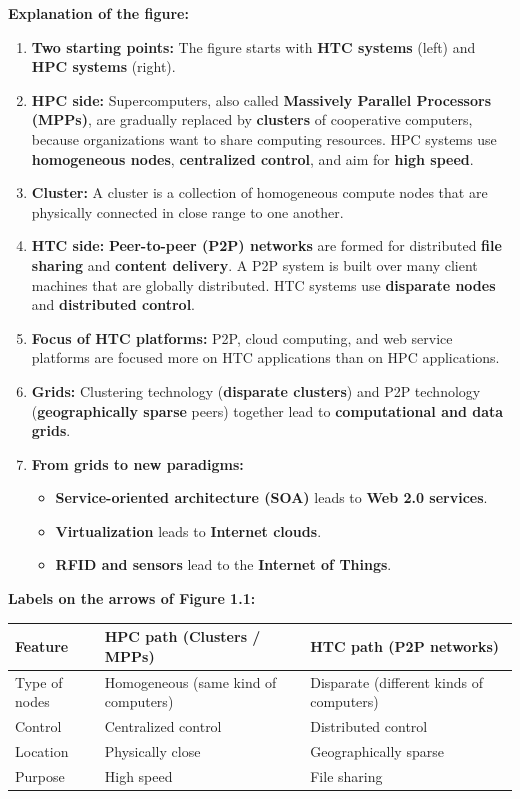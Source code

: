 \documentclass[11pt,a4paper]{article}
\begin{document}
\textbf{Explanation of the figure:}
\begin{enumerate}
\item \textbf{Two starting points:} The figure starts with \textbf{HTC systems} (left) and \textbf{HPC systems} (right).
\item \textbf{HPC side:} Supercomputers, also called \textbf{Massively Parallel Processors (MPPs)}, are gradually replaced by \textbf{clusters} of cooperative computers, because organizations want to share computing resources. HPC systems use \textbf{homogeneous nodes}, \textbf{centralized control}, and aim for \textbf{high speed}.
\item \textbf{Cluster:} A cluster is a collection of homogeneous compute nodes that are physically connected in close range to one another.
\item \textbf{HTC side:} \textbf{Peer-to-peer (P2P) networks} are formed for distributed \textbf{file sharing} and \textbf{content delivery}. A P2P system is built over many client machines that are globally distributed. HTC systems use \textbf{disparate nodes} and \textbf{distributed control}.
\item \textbf{Focus of HTC platforms:} P2P, cloud computing, and web service platforms are focused more on HTC applications than on HPC applications.
\item \textbf{Grids:} Clustering technology (\textbf{disparate clusters}) and P2P technology (\textbf{geographically sparse} peers) together lead to \textbf{computational and data grids}.
\item \textbf{From grids to new paradigms:}
  \begin{itemize}
  \item \textbf{Service-oriented architecture (SOA)} leads to \textbf{Web 2.0 services}.
  \item \textbf{Virtualization} leads to \textbf{Internet clouds}.
  \item \textbf{RFID and sensors} lead to the \textbf{Internet of Things}.
  \end{itemize}
\end{enumerate}

\textbf{Labels on the arrows of Figure 1.1:}

\begin{center}
\renewcommand{\arraystretch}{1.3}
\small
\begin{tabular}{|p{3cm}|p{5.4cm}|p{5.4cm}|}
\hline
\textbf{Feature} & \textbf{HPC path (Clusters / MPPs)} & \textbf{HTC path (P2P networks)} \\ \hline
Type of nodes & Homogeneous (same kind of computers) & Disparate (different kinds of computers) \\ \hline
Control & Centralized control & Distributed control \\ \hline
Location & Physically close & Geographically sparse \\ \hline
Purpose & High speed & File sharing \\ \hline
\end{tabular}
\end{center}
\end{document}

